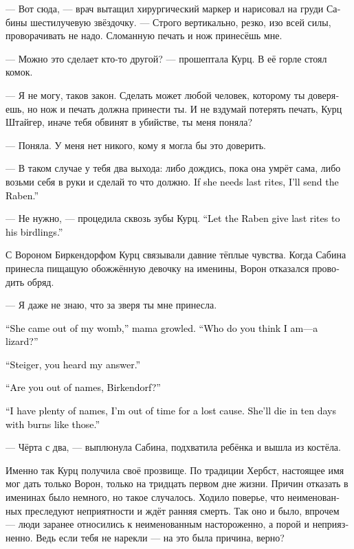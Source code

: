 \documentclass[a4paper,12pt,fleqn]{book}\usepackage{cooltooltips}\usepackage{polyglossia}\setdefaultlanguage[babelshorthands=true]{russian}\setotherlanguage{english}\defaultfontfeatures{Ligatures=TeX,Mapping=tex-text} \usepackage{xcolor}\definecolor{lightgray}{HTML}{bbbbbb}\color{lightgray}\newcommand{\ml}[3]{\textenglish{\textcolor{black}{#3}}}
\begin{document}
--- Вот сюда, --- врач вытащил хирургический маркер и нарисовал на груди Сабины шестилучевую звёздочку.
--- Строго вертикально, резко, изо всей силы, проворачивать не надо.
Сломанную печать и нож принесёшь мне.

--- Можно это сделает кто-то другой? --- прошептала Курц.
В её горле стоял комок.

--- Я не могу, таков закон.
Сделать может любой человек, которому ты доверяешь, но нож и печать должна принести ты.
И не вздумай потерять печать, Курц Штайгер, иначе тебя обвинят в убийстве, ты меня поняла?

--- Поняла.
У меня нет никого, кому я могла бы это доверить.

--- В таком случае у тебя два выхода: либо дождись, пока она умрёт сама, либо возьми себя в руки и сделай то что должно.
\ml{$0$}
{Если нужно отпеть --- я могу прислать Ворона.}
{If she needs last rites, I'll send the Raben.''}

--- Не нужно, --- процедила сквозь зубы Курц.
\ml{$0$}
{--- Пусть Ворон своих птенцов отпевает.}
{``Let the Raben give last rites to his birdlings.''}

С Вороном Биркендорфом Курц связывали давние тёплые чувства.
Когда Сабина принесла пищащую обожжённую девочку на именины, Ворон отказался проводить обряд.

--- Я даже не знаю, что за зверя ты мне принесла.

\ml{$0$}
{--- Она вышла из моей утробы, --- прорычала мама.}
{``She came out of my womb,'' mama growled.}
\ml{$0$}
{--- Я, по-твоему, кто --- ящерица?}
{``Who do you think I am---a lizard?''}

\ml{$0$}
{--- Штайгер, ты слышала мой ответ.}
{``Steiger, you heard my answer.''}

\ml{$0$}
{--- У тебя имена закончились, Биркендорф?}
{``Are you out of names, Birkendorf?''}

\ml{$0$}
{--- Имён предостаточно, а вот времени на безнадёжных нет.}
{``I have plenty of names, I'm out of time for a lost cause.}
\ml{$0$}
{Она умрёт в течение десяти дней с такими ожогами.}
{She'll die in ten days with burns like those.''}

--- Чёрта с два, --- выплюнула Сабина, подхватила ребёнка и вышла из костёла.

Именно так Курц получила своё прозвище.
По традиции Хербст, настоящее имя мог дать только Ворон, только на тридцать первом дне жизни.
Причин отказать в именинах было немного, но такое случалось.
Ходило поверье, что неименованных преследуют неприятности и ждёт ранняя смерть.
Так оно и было, впрочем --- люди заранее относились к неименованным настороженно, а порой и неприязненно.
Ведь если тебя не нарекли --- на это была причина, верно?
\end{document}

